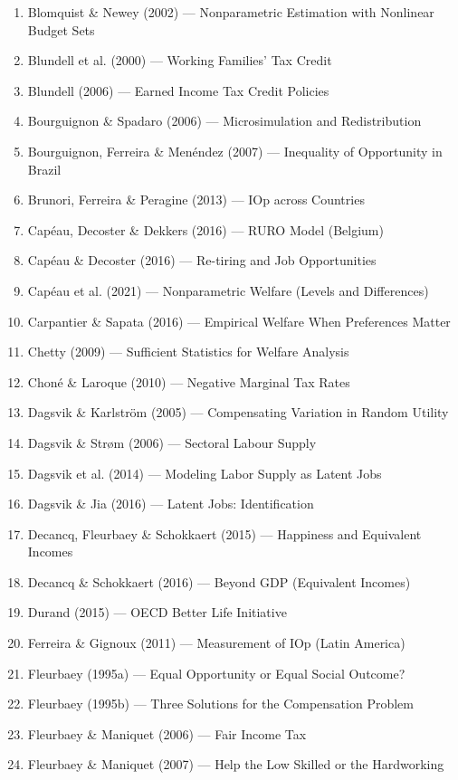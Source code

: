 \documentclass[11pt,a4paper]{article}
\begin{document}
\begin{enumerate}
  \item Blomquist \& Newey (2002) — Nonparametric Estimation with Nonlinear Budget Sets
  \item Blundell et al. (2000) — Working Families' Tax Credit
  \item Blundell (2006) — Earned Income Tax Credit Policies
  \item Bourguignon \& Spadaro (2006) — Microsimulation and Redistribution
  \item Bourguignon, Ferreira \& Menéndez (2007) — Inequality of Opportunity in Brazil
  \item Brunori, Ferreira \& Peragine (2013) — IOp across Countries
  \item Capéau, Decoster \& Dekkers (2016) — RURO Model (Belgium)
  \item Capéau \& Decoster (2016) — Re-tiring and Job Opportunities
  \item Capéau et al. (2021) — Nonparametric Welfare (Levels and Differences)
  \item Carpantier \& Sapata (2016) — Empirical Welfare When Preferences Matter
  \item Chetty (2009) — Sufficient Statistics for Welfare Analysis
  \item Choné \& Laroque (2010) — Negative Marginal Tax Rates
  \item Dagsvik \& Karlström (2005) — Compensating Variation in Random Utility
  \item Dagsvik \& Strøm (2006) — Sectoral Labour Supply
  \item Dagsvik et al. (2014) — Modeling Labor Supply as Latent Jobs
  \item Dagsvik \& Jia (2016) — Latent Jobs: Identification
  \item Decancq, Fleurbaey \& Schokkaert (2015) — Happiness and Equivalent Incomes
  \item Decancq \& Schokkaert (2016) — Beyond GDP (Equivalent Incomes)
  \item Durand (2015) — OECD Better Life Initiative
  \item Ferreira \& Gignoux (2011) — Measurement of IOp (Latin America)
  \item Fleurbaey (1995a) — Equal Opportunity or Equal Social Outcome?
  \item Fleurbaey (1995b) — Three Solutions for the Compensation Problem
  \item Fleurbaey \& Maniquet (2006) — Fair Income Tax
  \item Fleurbaey \& Maniquet (2007) — Help the Low Skilled or the Hardworking

\end{enumerate}
\end{document}
